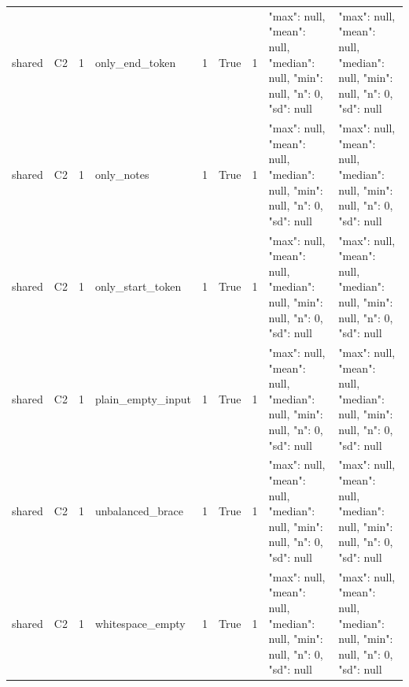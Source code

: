 \begin{tabular}{lllllllll}
shared & C2 & 1 & only\_end\_token & 1 & True & 1 & {"max": null, "mean": null, "median": null, "min": null, "n": 0, "sd": null} & {"max": null, "mean": null, "median": null, "min": null, "n": 0, "sd": null} \\
shared & C2 & 1 & only\_notes & 1 & True & 1 & {"max": null, "mean": null, "median": null, "min": null, "n": 0, "sd": null} & {"max": null, "mean": null, "median": null, "min": null, "n": 0, "sd": null} \\
shared & C2 & 1 & only\_start\_token & 1 & True & 1 & {"max": null, "mean": null, "median": null, "min": null, "n": 0, "sd": null} & {"max": null, "mean": null, "median": null, "min": null, "n": 0, "sd": null} \\
shared & C2 & 1 & plain\_empty\_input & 1 & True & 1 & {"max": null, "mean": null, "median": null, "min": null, "n": 0, "sd": null} & {"max": null, "mean": null, "median": null, "min": null, "n": 0, "sd": null} \\
shared & C2 & 1 & unbalanced\_brace & 1 & True & 1 & {"max": null, "mean": null, "median": null, "min": null, "n": 0, "sd": null} & {"max": null, "mean": null, "median": null, "min": null, "n": 0, "sd": null} \\
shared & C2 & 1 & whitespace\_empty & 1 & True & 1 & {"max": null, "mean": null, "median": null, "min": null, "n": 0, "sd": null} & {"max": null, "mean": null, "median": null, "min": null, "n": 0, "sd": null} \\
\end{tabular}